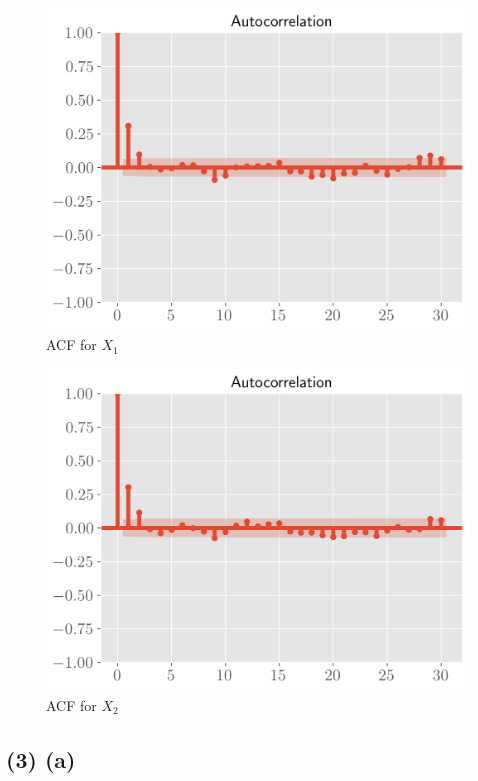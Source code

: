 \documentclass[11pt]{article}
\begin{document}
\begin{figure}[!h]
    \centering
    \includegraphics[scale=.6
    ]{../figures/acf1.png}
    \caption{ACF for $X_1$}
    \label{fig:my_label}
\end{figure}

\begin{figure}[!h]
    \centering
    \includegraphics[scale=.6
    ]{../figures/acf2.png}
    \caption{ACF for $X_2$}
    \label{fig:my_label}
\end{figure}
\newpage

\subsection*{(3) (a)}
\end{document}

